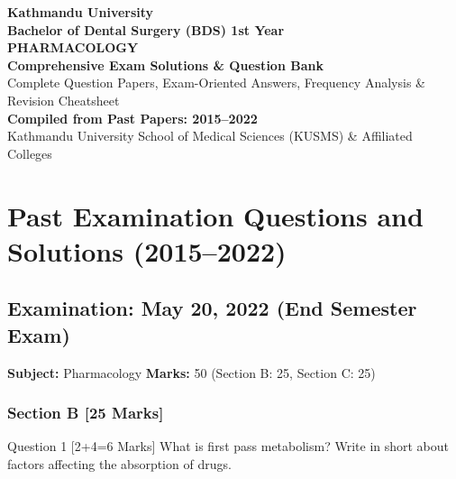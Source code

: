 \documentclass[11pt,a4paper]{article}
\begin{document}
\begin{titlepage}
    \centering
    \vspace*{2cm}
    {\Huge \textbf{Kathmandu University}}\\[0.5cm]
    {\LARGE \textbf{Bachelor of Dental Surgery (BDS) 1st Year}}\\[1.5cm]
    {\Huge \textbf{PHARMACOLOGY}}\\[0.8cm]
    {\Large \textbf{Comprehensive Exam Solutions \& Question Bank}}\\[0.5cm]
    {\large Complete Question Papers, Exam-Oriented Answers, Frequency Analysis \& Revision Cheatsheet}\\[2cm]
    \vfill
    {\large \textbf{Compiled from Past Papers: 2015--2022}}\\[0.5cm]
    {\small Kathmandu University School of Medical Sciences (KUSMS) \& Affiliated Colleges}
    \vspace*{1.5cm}
\end{titlepage}

\tableofcontents
\newpage

\section{Past Examination Questions and Solutions (2015--2022)}

\subsection{Examination: May 20, 2022 (End Semester Exam)}
\textbf{Subject:} Pharmacology \quad \textbf{Marks:} 50 (Section B: 25, Section C: 25)

\subsubsection{Section B [25 Marks]}

\begin{qbox}{Question 1 [2+4=6 Marks]}
What is first pass metabolism? Write in short about factors affecting the absorption of drugs.
\end{qbox}
\end{document}
